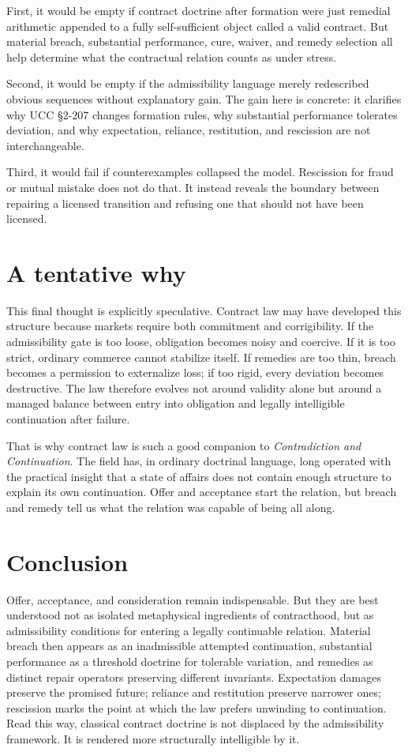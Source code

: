 \documentclass[11pt]{article}
\begin{document}
First, it would be empty if contract doctrine after formation were just remedial arithmetic appended to a fully self-sufficient object called a valid contract. But material breach, substantial performance, cure, waiver, and remedy selection all help determine what the contractual relation counts as under stress.

Second, it would be empty if the admissibility language merely redescribed obvious sequences without explanatory gain. The gain here is concrete: it clarifies why UCC \S 2-207 changes formation rules, why substantial performance tolerates deviation, and why expectation, reliance, restitution, and rescission are not interchangeable.

Third, it would fail if counterexamples collapsed the model. Rescission for fraud or mutual mistake does not do that. It instead reveals the boundary between repairing a licensed transition and refusing one that should not have been licensed.

\section{A tentative why}
This final thought is explicitly speculative. Contract law may have developed this structure because markets require both commitment and corrigibility. If the admissibility gate is too loose, obligation becomes noisy and coercive. If it is too strict, ordinary commerce cannot stabilize itself. If remedies are too thin, breach becomes a permission to externalize loss; if too rigid, every deviation becomes destructive. The law therefore evolves not around validity alone but around a managed balance between entry into obligation and legally intelligible continuation after failure.

That is why contract law is such a good companion to \textit{Contradiction and Continuation}. The field has, in ordinary doctrinal language, long operated with the practical insight that a state of affairs does not contain enough structure to explain its own continuation. Offer and acceptance start the relation, but breach and remedy tell us what the relation was capable of being all along.

\section{Conclusion}
Offer, acceptance, and consideration remain indispensable. But they are best understood not as isolated metaphysical ingredients of contracthood, but as admissibility conditions for entering a legally continuable relation. Material breach then appears as an inadmissible attempted continuation, substantial performance as a threshold doctrine for tolerable variation, and remedies as distinct repair operators preserving different invariants. Expectation damages preserve the promised future; reliance and restitution preserve narrower ones; rescission marks the point at which the law prefers unwinding to continuation. Read this way, classical contract doctrine is not displaced by the admissibility framework. It is rendered more structurally intelligible by it.
\end{document}
